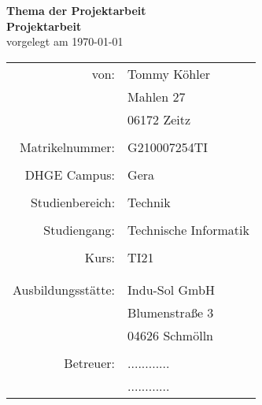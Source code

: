 \thispagestyle{empty}

\begin{center}
	{\LARGE \textbf{Thema der Projektarbeit}}\\
	\vspace{2.0cm}				%
	{\Huge \textbf{Projektarbeit}}\\
	\vspace{1.0cm}
	vorgelegt am \today\\
	\vspace{2.0cm}
	
\begin{tabular}{rl}
	von:				& Tommy Köhler\\
						& Mahlen 27\\
						& 06172 Zeitz\\
						& \\
	Matrikelnummer: 	& G210007254TI\\
						& \\
	DHGE Campus:		& Gera\\
						& \\
	Studienbereich:		& Technik\\
						& \\
	Studiengang:		& Technische Informatik\\
						& \\
	Kurs:				& TI21\\
						& \\
						& \\
	Ausbildungsstätte:	& Indu-Sol GmbH\\
						& Blumenstraße 3\\
						& 04626 Schmölln\\
						& \\
	Betreuer:			& ............ \\
						& ............ \\
						
						
\end{tabular}
\end{center}